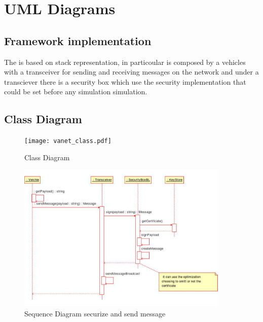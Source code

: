 \section{UML Diagrams}
\subsection{Framework implementation}
The \vs is based on stack representation, in particoular is composed by a vehicles with a transceiver for sending and receiving messages on the network and under a transciever there is a security box which use the security implementation that could be set before any simulation simulation.
\subsection{Class Diagram}
\begin{figure}[ht]
\centerline{\texttt{[image: vanet\_class.pdf]}}
\caption{Class Diagram}
\label{fig:class_diagram}
\end{figure}
\begin{figure}[ht]
\centerline{\includegraphics[width=0.9\textwidth]{baseline_send_message.pdf}}
\caption{Sequence Diagram \baseline securize and send message}
\label{fig:sequence_send_baseline}
\end{figure}
